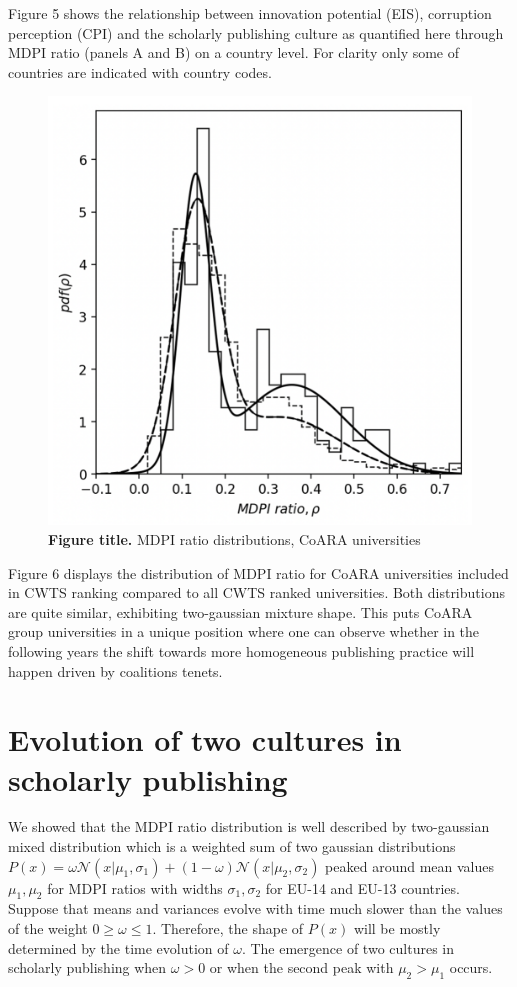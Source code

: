 \documentclass[amsfonts, amssymb, prl, superscriptaddress, notitlepage, twocolumn, nofootinbib]{revtex4-2}
\begin{document}
Figure 5 shows the relationship between innovation potential (EIS), corruption perception (CPI) and the scholarly publishing culture as quantified here through MDPI ratio (panels A and B) on a country level. For clarity only some of countries are indicated with country codes.

\begin{figure}
    \centering
    \includegraphics[width=.6\linewidth]{Fig05.png}
    \caption{\label{fig:fig5} {\bf Figure title.} MDPI ratio distributions, CoARA universities  
}
\end{figure}

Figure 6 displays the distribution of MDPI ratio for CoARA universities included in CWTS ranking compared to all CWTS ranked universities. Both distributions are quite similar, exhibiting two-gaussian mixture shape. This puts CoARA group universities in a unique position where one can observe whether in the following years the shift towards more homogeneous publishing practice will happen driven by coalitions tenets.   

\section{Evolution of two cultures in scholarly publishing }
We showed that the MDPI ratio distribution is well described by two-gaussian mixed distribution which is a weighted sum of two gaussian distributions $P(x) = \omega\mathcal{N}(x|\mu_1, \sigma_1) + (1-\omega)\mathcal{N}(x|\mu_2, \sigma_2)$ peaked around mean values $\mu_1, \mu_2$ for MDPI ratios with widths $\sigma_1, \sigma_2$ for EU-14 and EU-13 countries. Suppose that means and variances evolve with time much slower than the values of the weight $0\ge\omega\le 1$.  Therefore, the shape of $P(x)$ will be mostly determined by the time evolution of $\omega$. The emergence of two cultures in scholarly publishing when $\omega > 0$ or when the second peak with $\mu_2 >\mu_1$ occurs.  
\end{document}
